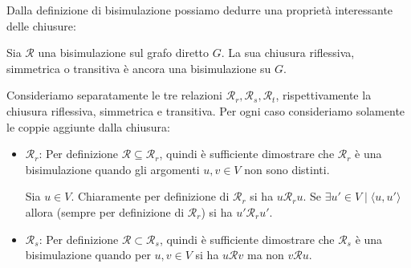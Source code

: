 Dalla definizione di bisimulazione possiamo dedurre una proprietà interessante delle chiusure:
\begin{theorem}
    Sia $\mathcal{R}$ una bisimulazione sul grafo diretto $G$. La sua chiusura riflessiva, simmetrica o transitiva è ancora una bisimulazione su $G$.
\end{theorem}
\begin{proof2}
    Consideriamo separatamente le tre relazioni $\mathcal{R}_r, \mathcal{R}_s, \mathcal{R}_t$, rispettivamente la chiusura riflessiva, simmetrica e transitiva. Per ogni caso consideriamo solamente le coppie aggiunte dalla chiusura:
    \begin{itemize}
        \item $\mathcal{R}_r$: Per definizione $\mathcal{R} \subseteq \mathcal{R}_r$, quindi è sufficiente dimostrare che $\mathcal{R}_r$ è una bisimulazione quando gli argomenti $u,v \in V$ non sono distinti.

        Sia $u \in V$. Chiaramente per definizione di $\mathcal{R}_r$ si ha $u \mathcal{R}_r u$. Se $\exists u' \in V \mid \langle u, u' \rangle$ allora (sempre per definizione di $\mathcal{R}_r$) si ha $u' \mathcal{R}_r u'$.
        \item $\mathcal{R}_s$: Per definizione $\mathcal{R} \subset \mathcal{R}_s$, quindi è sufficiente dimostrare che $\mathcal{R}_s$ è una bisimulazione quando per $u,v \in V$ si ha $u \mathcal{R} v$ ma non $v \mathcal{R} u$.


\end{itemize}
\end{proof2}
